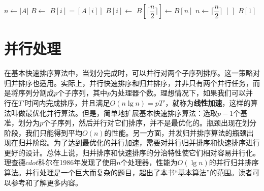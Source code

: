 \documentclass[b5paper]{ctexart}
\begin{document}
\begin{algorithmic}[1]
  \State $n \gets |A|$
  \State $B \gets $ 
    \State $B[i] = [A[i]]$
  \EndFor
      \State $B[i] \gets$ 
    \EndFor
      \State $B[\lceil \dfrac{n}{2} \rceil] \gets B[n]$
    \EndIf
    \State $n \gets \lceil \dfrac{n}{2} \rceil$
  \EndWhile
    \State \Return $[\ ]$
  \EndIf
  \State \Return $B[1]$
\EndFunction
\end{algorithmic}

\begin{Exercise}\label{ex:pairwise-fold}
\end{Exercise}

\begin{Answer}[ref = {ex:pairwise-fold}]
\end{Answer}

\section{并行处理}

在基本快速排序算法中，当划分完成时，可以并行对两个子序列排序。这一策略对归并排序也适用。实际上，并行快速排序和归并排序，并非只有两个并行任务，而是将序列分割成$p$个子序列，其中$p$为处理器个数。理想情况下，如果我们可以并行在$T'$时间内完成排序，并且满足$O(n \lg n) = p T'$，就称为\textbf{线性加速}，这样的算法叫做最优化并行算法。但是，简单地扩展基本快速排序算法：选取$p-1$个基准，划分为$p$个子序列，然后并行对它们排序，并不是最优化的。瓶颈出现在划分阶段，我们只能得到平均$O(n)$的性能。另一方面，并发归并排序算法的瓶颈出现在归并阶段。为了达到最优化的并行加速，需要对并行归并排序和快速排序进行更好的设计。总体上说，归并排序和快速排序的分治特性使它们相对容易并行化。理查德$cdot$科尔在1986年发现了使用$n$个处理器，性能为$O(\lg n)$的并行归并排序算法\cite{para-msort}。并行处理是一个巨大而复杂的题目，超出了本书“基本算法”的范围。读者可以参考\cite{para-msort}和\cite{para-qsort}了解更多内容。
\end{document}

